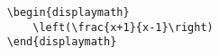 \documentclass{article}
\begin{document}
\begin{lstlisting}
    \begin{displaymath}
        \left(\frac{x+1}{x-1}\right)
    \end{displaymath}

\end{lstlisting}
\end{document}
